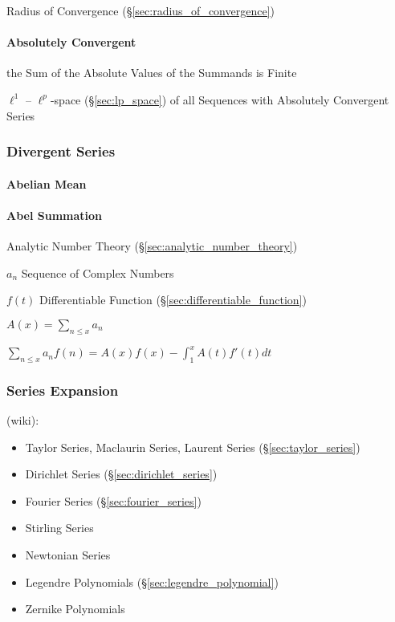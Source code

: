 \fist Radius of Convergence (\S\ref{sec:radius_of_convergence})



\paragraph{Absolutely Convergent}\label{sec:absolutely_convergent}\hfill

the Sum of the Absolute Values of the Summands is Finite

$\ell^1$ -- $\ell^p$-space (\S\ref{sec:lp_space}) of all Sequences with
Absolutely Convergent Series



\subsubsection{Divergent Series}\label{sec:divergent_series}

\paragraph{Abelian Mean}\label{sec:abelian_mean}\hfill

\paragraph{Abel Summation}\label{sec:abel_summation}\hfill

Analytic Number Theory (\S\ref{sec:analytic_number_theory})

$a_n$ Sequence of Complex Numbers

$f(t)$ Differentiable Function (\S\ref{sec:differentiable_function})

$A(x) = \sum_{n \leq x} a_n$

$\sum_{n \leq x} a_n f(n) = A(x)f(x) - \int_1^x A(t)f'(t) dt$



\subsubsection{Series Expansion}\label{sec:series_expansion}

(wiki):
\begin{itemize}
  \item Taylor Series, Maclaurin Series, Laurent Series
    (\S\ref{sec:taylor_series})
  \item Dirichlet Series (\S\ref{sec:dirichlet_series})
  \item Fourier Series (\S\ref{sec:fourier_series})
  \item Stirling Series
  \item Newtonian Series
  \item Legendre Polynomials (\S\ref{sec:legendre_polynomial})
  \item Zernike Polynomials
\end{itemize}



